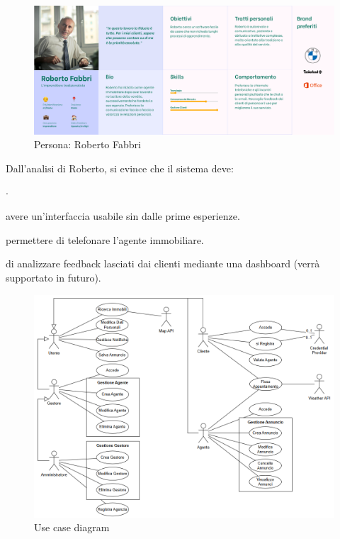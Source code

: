 \begin{figure}[h]
    \centering
    \includegraphics[width=\textwidth]{assets/personas/roberto-fabbri.png}
    \caption{Persona: Roberto Fabbri}
    \label{fig:roberto-fabbri}
\end{figure}

\noindent
Dall'analisi di Roberto, si evince che il sistema deve:
\begin{list}{$\cdot$}{}
    \item avere un'interfaccia usabile sin dalle prime esperienze.
    \item permettere di telefonare l'agente immobiliare.
    \item di analizzare feedback lasciati dai clienti mediante una dashboard (verrà supportato in futuro).
\end{list}

\begin{figure}[h]
    \centering
    \includegraphics[width=\textwidth]{assets/diagrams/use-case-diagram.png}
    \caption{Use case diagram}
    \label{fig:use-case-diagram}
\end{figure}

